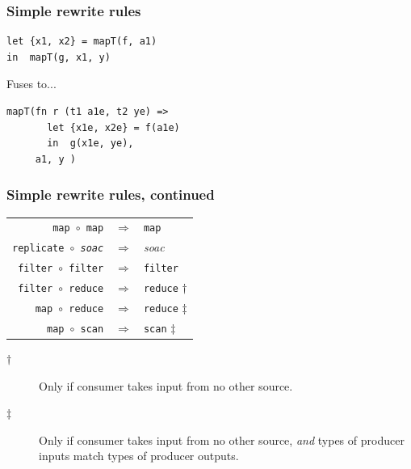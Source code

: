 \documentclass{beamer}
\begin{document}
\begin{frame}[fragile]
  \frametitle{Simple rewrite rules}

\begin{lstlisting}
let {x1, x2} = mapT(f, a1)
in  mapT(g, x1, y)
\end{lstlisting}
Fuses to...
\begin{lstlisting}
mapT(fn r (t1 a1e, t2 ye) =>
       let {x1e, x2e} = f(a1e)
       in  g(x1e, ye),
     a1, y )
\end{lstlisting}

\end{frame}

\begin{frame}[fragile]
  \frametitle{Simple rewrite rules, continued}

\begin{center}
\begin{tabular}{rcl}
\texttt{map $\circ$ map}    & $\Rightarrow$ & \texttt{map} \\
\texttt{replicate $\circ$ \textit{soac}} & $\Rightarrow$ & \textit{soac} \\
\texttt{filter $\circ$ filter} & $\Rightarrow$ & \texttt{filter}  \\
\texttt{filter $\circ$ reduce} & $\Rightarrow$ & \texttt{reduce} $\dag$  \\
\texttt{map $\circ$ reduce} & $\Rightarrow$ & \texttt{reduce} $\ddag$ \\
\texttt{map $\circ$ scan} & $\Rightarrow$ & \texttt{scan} $\ddag$ \\
\end{tabular}
\end{center}

\begin{description}
\item[$\dag$] Only if consumer takes input from no other
  source.
\item[$\ddag$] Only if consumer takes input from no other source,
  \textit{and} types of producer inputs match types of producer
  outputs.
\end{description}

\end{frame}
\end{document}
